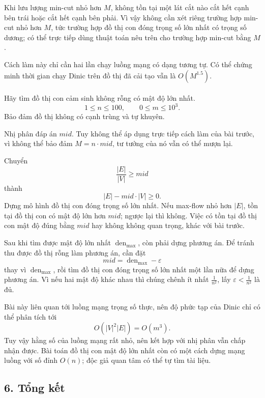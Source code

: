 \documentclass[11pt]{article}
\begin{document}
Khi lưu lượng min-cut nhỏ hơn \(M\), không tồn tại một lát cắt nào cắt hết cạnh
bên trái hoặc cắt hết cạnh bên phải. Vì vậy không cần xét riêng trường hợp
min-cut nhỏ hơn \(M\), tức trường hợp đồ thị con đóng trọng số lớn nhất có
trọng số dương; có thể trực tiếp dùng thuật toán nêu trên cho trường hợp
min-cut bằng \(M\).

Cách làm này chỉ cần hai lần chạy luồng mạng có dạng tương tự. Có thể chứng
minh thời gian chạy Dinic trên đồ thị đã cải tạo vẫn là \(O(M^{1.5})\).

\paragraph{}
Hãy tìm đồ thị con cảm sinh không rỗng có mật độ lớn nhất.
\[
  1\le n\le100,\qquad 0\le m\le10^3.
\]
Bảo đảm đồ thị không có cạnh trùng và tự khuyên.

Nhị phân đáp án \(\mathit{mid}\). Tuy không thể áp dụng trực tiếp cách làm của
bài trước, vì không thể bảo đảm \(M=n\cdot\mathit{mid}\), tư tưởng của nó vẫn
có thể mượn lại.

Chuyển
\[
  \frac{|E|}{|V|}\ge \mathit{mid}
\]
thành
\[
  |E|-\mathit{mid}\cdot |V|\ge0.
\]
Dựng mô hình đồ thị con đóng trọng số lớn nhất. Nếu max-flow nhỏ hơn \(|E|\),
tồn tại đồ thị con có mật độ lớn hơn \(\mathit{mid}\); ngược lại thì không.
Việc có tồn tại đồ thị con mật độ đúng bằng \(\mathit{mid}\) hay không không
quan trọng, khác với bài trước.

Sau khi tìm được mật độ lớn nhất \(\operatorname{den}_{\max}\), còn phải dựng
phương án. Để tránh thu được đồ thị rỗng làm phương án, cần đặt
\[
  \mathit{mid}=\operatorname{den}_{\max}-\varepsilon
\]
thay vì \(\operatorname{den}_{\max}\), rồi tìm đồ thị con đóng trọng số lớn
nhất một lần nữa để dựng phương án. Vì nếu hai mật độ khác nhau thì chúng
chênh ít nhất \(\frac{1}{n^2}\), lấy \(\varepsilon<\frac{1}{n^2}\) là đủ.

Bài này liên quan tới luồng mạng trọng số thực, nên độ phức tạp của Dinic chỉ
có thể phân tích tới
\[
  O(|V|^2|E|)=O(m^3).
\]
Tuy vậy hằng số của luồng mạng rất nhỏ, nên kết hợp với nhị phân vẫn chấp nhận
được. Bài toán đồ thị con mật độ lớn nhất còn có một cách dựng mạng luồng với
số đỉnh \(O(n)\); độc giả quan tâm có thể tự tìm tài liệu.

\subsection*{6. Tổng kết}
\end{document}
